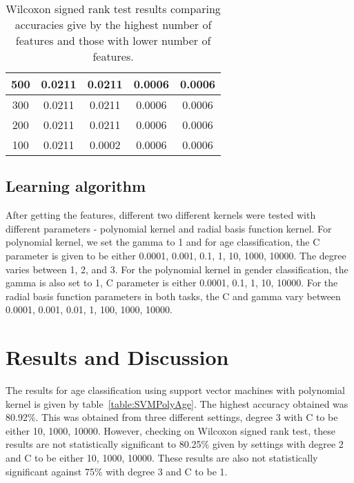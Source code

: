 \documentclass[a4paper]{llncs}
\begin{document}
\begin{table}[!htbp]
\begin{tabular}{|c|c|c|c|c|}
500                                & 0.0211          & 0.0211          & 0.0006          & 0.0006          \\ \hline
300                                & 0.0211          & 0.0211          & 0.0006          & 0.0006          \\ \hline
200                                & 0.0211          & 0.0211          & 0.0006          & 0.0006          \\ \hline
100                                & 0.0211          & 0.0002          & 0.0006          & 0.0006          \\ \hline
\end{tabular}
\caption{Wilcoxon signed rank test results comparing accuracies give by the highest number of features and those with lower number of features.}
\label{table:PValChoosingFeatures}
\end{table}


\subsection{Learning algorithm}
After getting the features, different two different kernels were tested with different parameters - polynomial kernel and radial basis function kernel. For polynomial kernel, we set the gamma to 1 and for age classification, the C parameter is given to be either 0.0001, 0.001, 0.1, 1, 10, 1000, 10000. The degree varies between 1, 2, and 3. For the polynomial kernel in gender classification, the gamma is also set to 1, C parameter is either 0.0001, 0.1, 1, 10, 10000. For the radial basis function parameters in both tasks, the C and gamma vary between 0.0001, 0.001, 0.01, 1, 100, 1000, 10000. 


\section{Results and Discussion}	
The results for age classification using support vector machines with polynomial kernel is given by table~\ref{table:SVMPolyAge}. The highest accuracy obtained was 80.92\%. This was obtained from three different settings, degree 3 with C to be either 10, 1000, 10000. However, checking on Wilcoxon signed rank test, these results are not statistically significant to 80.25\% given by settings with degree 2 and C to be either 10, 1000, 10000. These results are also not statistically significant against 75\% with degree 3 and C to be 1. 
\end{document}

